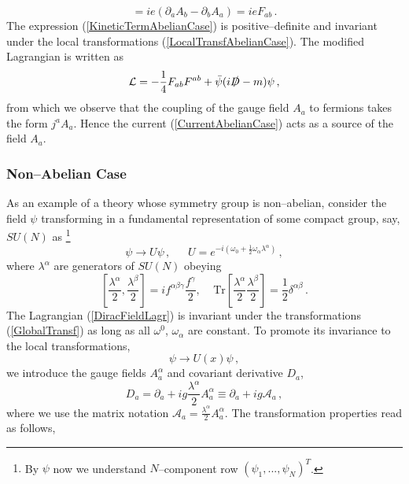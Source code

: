 \documentclass[11pt,a4paper]{article}
\begin{document}
\begin{equation}
[D_a,D_b]=ie(\partial_a A_b-\partial_b A_a)=ieF_{ab}   \,.
\end{equation}
The expression (\ref{KineticTermAbelianCase}) is positive--definite and invariant under the local transformations (\ref{LocalTransfAbelianCase}). The modified Lagrangian is written as
\begin{equation}
\mathcal{L}=-\dfrac{1}{4}F_{ab}F^{ab}+\bar{\psi}(i\slashed{D}-m)\psi   \,,
\end{equation}
from which we observe that the coupling of the gauge field $A_a$ to fermions takes the form $j^a A_a$. Hence the current (\ref{CurrentAbelianCase}) acts as a source of the field $A_a$.

\subsubsection{Non--Abelian Case}
As an example of a theory whose symmetry group is non--abelian, consider the field $\psi$ transforming in a fundamental representation of some compact group, say, $SU(N)$ as \footnote{By $\psi$ now we understand $N$--component row $(\psi_1,...,\psi_N)^T$.}
\begin{equation}\label{GlobalTransf}
\psi\rightarrow U\psi \,, ~~~~~~~ U=e^{-i(\omega_0+\frac{1}{2}\omega_\alpha\lambda^\alpha)}  \,,
\end{equation}
where $\lambda^\alpha$ are generators of $SU(N)$ obeying
\begin{equation}
\left[\dfrac{\lambda^\alpha}{2},\dfrac{\lambda^\beta}{2}\right]=if^{\alpha\beta\gamma}\dfrac{f^\gamma}{2},~~~~~\text{Tr}\left[\dfrac{\lambda^\alpha}{2}\dfrac{\lambda^\beta}{2}\right]=\dfrac{1}{2}\delta
^{\alpha\beta}  \,.
\end{equation}
The Lagrangian (\ref{DiracFieldLagr}) is invariant under the transformations (\ref{GlobalTransf}) as long as all $\omega^0$, $\omega_\alpha$ are constant. To promote its invariance to the local transformations,
\begin{equation}
\psi\rightarrow U(x)\psi  \,,
\end{equation}
we introduce the gauge fields $A^\alpha_a$ and covariant derivative $D_a$,
\begin{equation}
D_a=\partial_a+ig\dfrac{\lambda^\alpha}{2}A^\alpha_a\equiv\partial_a+ig\mathcal{A}_a  \,,
\end{equation}
where we use the matrix notation $\mathcal{A}_a=\frac{\lambda^\alpha}{2}A^\alpha_a$. The transformation properties read as follows,
\end{document}
